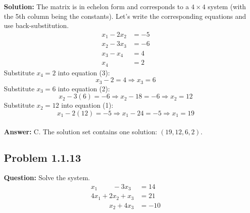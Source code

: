 \documentclass[11pt]{article}
\begin{document}
\textbf{Solution:}
The matrix is in echelon form and corresponds to a $4 \times 4$ system (with the 5th column being the constants). Let's write the corresponding equations and use back-substitution.
\begin{align}
    x_1 - 2x_2 &= -5 \\
    x_2 - 3x_3 &= -6 \\
    x_3 - x_4 &= 4 \\
    x_4 &= 2
\end{align}
Substitute $x_4 = 2$ into equation (3):
\[ x_3 - 2 = 4 \Rightarrow x_3 = 6 \]
Substitute $x_3 = 6$ into equation (2):
\[ x_2 - 3(6) = -6 \Rightarrow x_2 - 18 = -6 \Rightarrow x_2 = 12 \]
Substitute $x_2 = 12$ into equation (1):
\[ x_1 - 2(12) = -5 \Rightarrow x_1 - 24 = -5 \Rightarrow x_1 = 19 \]
\\
\textbf{Answer:} C. The solution set contains one solution: $(19, 12, 6, 2)$.


\subsection*{Problem 1.1.13}
\textbf{Question:} Solve the system.
\begin{align*}
    x_1 \phantom{+ 2x_2} - 3x_3 &= 14 \\
    4x_1 + 2x_2 + x_3 &= 21 \\
    \phantom{4x_1 +} x_2 + 4x_3 &= -10
\end{align*}
\end{document}

